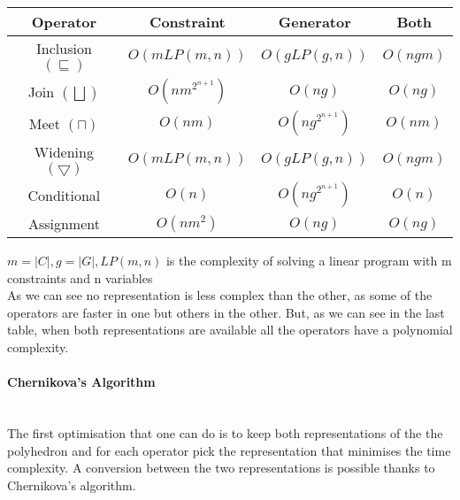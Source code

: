 \begin{center}
\begin{tabular}{||c c c c||} 
 
 \hline
 Operator & Constraint & Generator & Both \\ [0.5ex] 
 \hline
 Inclusion $(\sqsubseteq)$ & $O(mLP(m,n))$ & $O(gLP(g,n))$ & $O(ngm)$ \\ 
 \hline
 Join $(\bigsqcup)$ & $O(nm^{2^{n+1}})$ & $O(ng)$ & $O(ng)$ \\
 \hline
 Meet $(\sqcap)$ & $O(nm)$ & $O(ng^{2^{n+1}})$ & $O(nm)$\\
 \hline
 Widening $(\bigtriangledown)$ & $O(mLP(m,n))$ & $O(gLP(g,n))$ & $O(ngm)$ \\
 \hline
 Conditional & $O(n)$ & $O(ng^{2^{n+1}})$ & $O(n)$ \\ 
 \hline
 Assignment & $O(nm^2)$ & $O(ng)$ & $O(ng)$ \\ 
 
 
 \hline
\end{tabular}
\end{center}
$m=|C|,g=|G|,LP(m,n)$ is the complexity of solving a linear program with m constraints and n variables\\
As we can see no representation is less complex than the other, as some of the operators are faster in one but others in the other. But, as we can see in the last table, when both representations are available all the operators have a polynomial complexity.\\
\paragraph{Chernikova's Algorithm} \mbox{}\\
 The first optimisation that one can do is to keep both representations of the the polyhedron and for each operator pick the representation that minimises the time complexity. A conversion between the two representations is possible thanks to Chernikova's algorithm\cite{chernikova1968algorithm}. 
 
